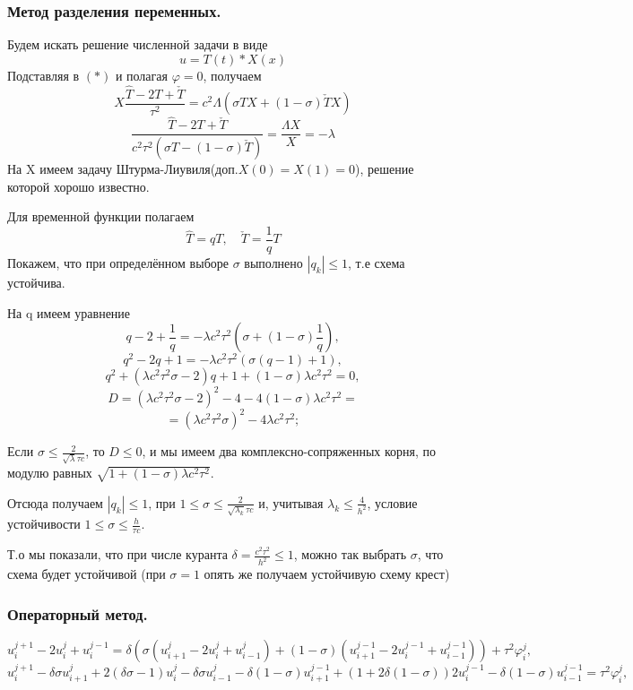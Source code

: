 \documentclass[12pt,a4paper]{article}
\begin{document}
\subsubsection{Метод разделения переменных.}
	 
Будем искать решение численной задачи в виде $$u = T(t)*X(x)$$
Подставляя в $(*)$ и полагая $\varphi = 0$, получаем $$X\frac{\hat{T}-2T +\check{T}}{\tau^2} = c^2\Lambda(\sigma TX+(1-\sigma)\check{T}X)$$ $$\frac{\hat{T}-2T +\check{T}}{c^2\tau^2(\sigma T - (1-\sigma)\check{T})} = \frac{\Lambda X}{X} = -\lambda $$
На X имеем задачу Штурма-Лиувиля(доп.$ X(0) = X(1) = 0$), решение которой хорошо известно. 

Для временной функции полагаем $$\hat{T} = qT , \quad\check{T} = \frac{1}{q}T$$
Покажем, что при определённом выборе $\sigma$ выполнено $|q_{k}|\leqslant 1$, т.е схема устойчива.


 На q имеем уравнение
 $$q - 2 + \frac{1}{q} = -\lambda c^2\tau^2(\sigma +(1-\sigma)\frac{1}{q}),$$
					 $$q^2-2q+1 = -\lambda c^2\tau^2(\sigma(q-1) + 1),$$
					 $$q^2+(\lambda c^2\tau^2\sigma-2)q+1+(1-\sigma)\lambda c^2\tau^2 = 0,$$
					 $$D = (\lambda c^2\tau^2\sigma-2)^2 -4 - 4(1-\sigma)\lambda c^2\tau^2 = $$
					 $$= (\lambda c^2\tau^2\sigma)^2 - 4\lambda c^2\tau^2; $$


Если $\sigma \leqslant\frac{2}{\sqrt{\lambda}\tau c} $, то $ D\leqslant 0$, и мы имеем два комплексно-сопряженных корня, по модулю равных $\sqrt{1+(1-\sigma)\lambda c^2\tau^2}$.

Отсюда получаем $ |q_{k}| \leqslant 1 $, при  $ 1\leqslant\sigma \leqslant \frac{2}{\sqrt{\lambda_{k}}\tau c}$ и, учитывая $\lambda_k \leqslant \frac{4}{h^2}$, условие устойчивости $1\leqslant\sigma \leqslant \frac{h}{\tau c}$.

Т.о мы показали, что при числе куранта $\delta =\frac{c^2\tau^2}{h^2}\leqslant1$, можно так выбрать $\sigma$, что схема будет устойчивой (при $\sigma = 1$ опять же получаем устойчивую схему крест)


\subsubsection{Операторный метод.}
$${u_i^{j+1}- 2u_i^j + u_i^{j-1}} = \delta(\sigma(u_{i+1}^j- 2u_i^j + u_{i-1}^j) + (1-\sigma)(u_{i+1}^{j-1}- 2u_i^{j-1} + u_{i-1}^{j-1})) + \tau^2\varphi_i^j,$$ 
$$u_i^{j+1} - \delta\sigma u_{i+1}^j + 2(\delta\sigma - 1)u_i^j - \delta\sigma u_{i-1}^j - \delta (1-\sigma)u_{i+1}^{j-1} + (1+2\delta(1-\sigma))2u_i^{j-1} - \delta (1-\sigma)u_{i-1}^{j-1}= \tau^2\varphi_i^j,$$
\end{document}
